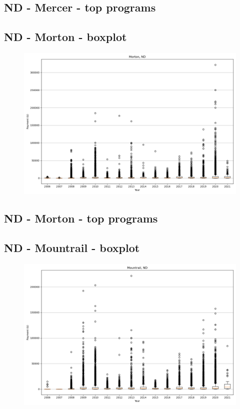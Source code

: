 \subsection*{ND - Mercer - top programs}

\newpage
\subsection*{ND - Morton - boxplot}
\begin{figure}[h]
\centering
\includegraphics[width=7in]{../output/boxplots/counties/Morton-ND_boxplot.png}
\end{figure}


\subsection*{ND - Morton - top programs}

\newpage
\subsection*{ND - Mountrail - boxplot}
\begin{figure}[h]
\centering
\includegraphics[width=7in]{../output/boxplots/counties/Mountrail-ND_boxplot.png}
\end{figure}


